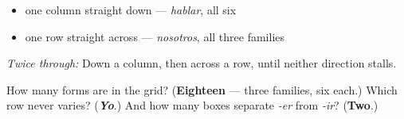 \begin{itemize}
\raggedright
  \item one column straight down — \emph{hablar}, all six
  \item one row straight across — \emph{nosotros}, all three families
\end{itemize}

\emph{Twice through:} Down a column, then across a row, until neither direction stalls.

\begin{tcolorbox}[breakable,colback=teal!4,colframe=teal!35!black,title={Before you move on}]
How many forms are in the grid? (\textbf{Eighteen} — three families, six each.) Which row never varies? (\emph{\textbf{Yo}}.) And how many boxes separate \emph{-er} from \emph{-ir}? (\textbf{Two}.)
\end{tcolorbox}
